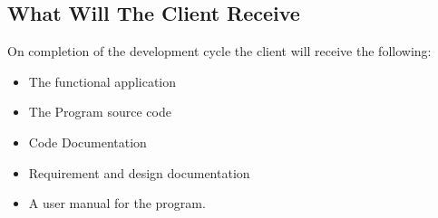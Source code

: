 \subsection{What Will The Client Receive}
On completion of the development cycle the client will receive the following:
\begin{itemize}
\item The functional application
\item The Program source code
\item Code Documentation
\item Requirement and design documentation
\item A user manual for the program.
\end{itemize}